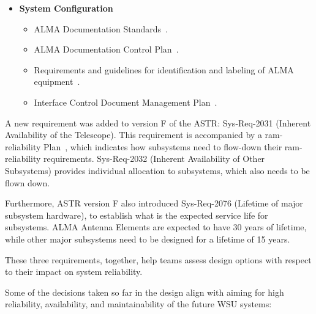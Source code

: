 \begin{itemize}[itemsep=-0.5em]
    \item \textbf{System Configuration}
    \begin{itemize}[itemsep=-0.5em]
        \item ALMA Documentation Standards~\cite{doc_standards}.
        \item ALMA Documentation Control Plan~\cite{doc_control_plan}.
        \item Requirements and guidelines for identification and labeling of ALMA equipment~\cite{labeling_reqs}.
        \item Interface Control Document Management Plan~\cite{interface_mgmt_plan}.
    \end{itemize}
\end{itemize}

A new requirement was added to version F of the \ac{ASTR}: Sys-Req-2031 (Inherent Availability of the Telescope). This requirement is accompanied by a \ac{ram-reliability} Plan~\cite{ram_plan}, which indicates how subsystems need to flow-down their \ac{ram-reliability} requirements. Sys-Req-2032 (Inherent Availability of Other Subsystems) provides individual allocation to subsystems, which also needs to be flown down.

Furthermore, \ac{ASTR} version F also introduced Sys-Req-2076 (Lifetime of major subsystem hardware), to establish what is the expected service life for subsystems. ALMA Antenna Elements are expected to have 30 years of lifetime, while other major subsystems need to be designed for a lifetime of 15 years.

These three requirements, together, help teams assess design options with respect to their impact on system reliability.

Some of the decisions taken so far in the design align with aiming for high reliability, availability, and maintainability of the future WSU systems:

